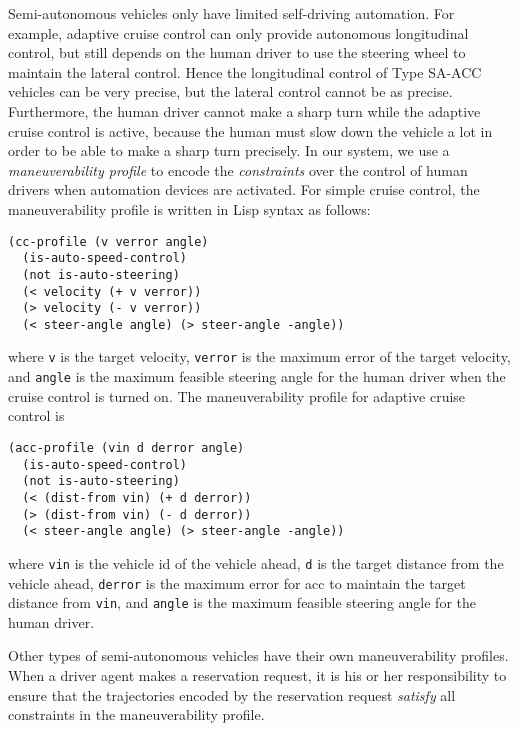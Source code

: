 Semi-autonomous vehicles only have limited self-driving automation.
For example, adaptive cruise control can only provide autonomous
longitudinal control, but still depends on the human driver to use the
steering wheel to maintain the lateral control.  Hence the
longitudinal control of Type SA-ACC vehicles can be very precise, but
the lateral control cannot be as precise.  Furthermore, the human
driver cannot make a sharp turn while the adaptive cruise control is
active, because the human must slow down the vehicle a lot in order to
be able to make a sharp turn precisely.  In our system, we use a
\emph{maneuverability profile} to encode the \emph{constraints} over the
control of human drivers when automation devices are activated.  For
simple cruise control, the maneuverability profile is written in Lisp
syntax as follows:
\begin{small}
\begin{verbatim}
(cc-profile (v verror angle)
  (is-auto-speed-control)
  (not is-auto-steering)
  (< velocity (+ v verror))
  (> velocity (- v verror))
  (< steer-angle angle) (> steer-angle -angle))
\end{verbatim}
\end{small}
\noindent
where \texttt{v} is the target velocity, \texttt{verror} is the
maximum error of the target velocity, and \texttt{angle} is the
maximum feasible steering angle for the human driver when the cruise
control is turned on.  The maneuverability profile for adaptive cruise
control is
\begin{small}
\begin{verbatim}
(acc-profile (vin d derror angle)
  (is-auto-speed-control)
  (not is-auto-steering)
  (< (dist-from vin) (+ d derror))
  (> (dist-from vin) (- d derror))
  (< steer-angle angle) (> steer-angle -angle))
\end{verbatim}
\end{small}
\noindent
where \texttt{vin} is the vehicle id of the vehicle ahead,
\texttt{d} is the target distance from the vehicle ahead, \texttt{derror}
is the maximum error for acc to maintain the target distance from
\texttt{vin}, and \texttt{angle} is the maximum feasible steering
angle for the human driver.

Other types of semi-autonomous vehicles have their own maneuverability
profiles.  When a driver agent makes a reservation request, it is
his or her responsibility to ensure that the trajectories encoded by the
reservation request \emph{satisfy} all constraints in the
maneuverability profile.


